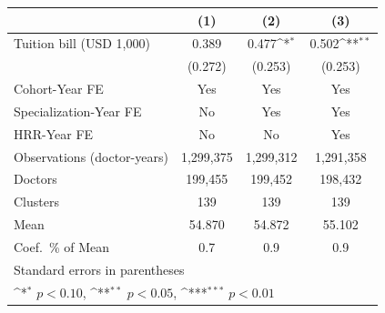{
\def\sym#1{\ifmmode^{#1}\else\(^{#1}\)\fi}
\begin{tabular}{l*{3}{c}}
\hline\hline
                    &\multicolumn{1}{c}{(1)}         &\multicolumn{1}{c}{(2)}         &\multicolumn{1}{c}{(3)}         \\
\hline
Tuition bill (USD 1,000)&       0.389         &       0.477\sym{*}  &       0.502\sym{**} \\
                    &     (0.272)         &     (0.253)         &     (0.253)         \\
[1em]
Cohort-Year FE      &         Yes         &         Yes         &         Yes         \\
[1em]
Specialization-Year FE&          No         &         Yes         &         Yes         \\
[1em]
HRR-Year FE         &          No         &          No         &         Yes         \\
\hline
Observations (doctor-years)&   1,299,375         &   1,299,312         &   1,291,358         \\
Doctors             &     199,455         &     199,452         &     198,432         \\
Clusters            &         139         &         139         &         139         \\
Mean                &      54.870         &      54.872         &      55.102         \\
Coef.\ \% of Mean   &         0.7         &         0.9         &         0.9         \\
\hline\hline
\multicolumn{4}{l}{\footnotesize Standard errors in parentheses}\\
\multicolumn{4}{l}{\footnotesize \sym{*} \(p<0.10\), \sym{**} \(p<0.05\), \sym{***} \(p<0.01\)}\\
\end{tabular}
}
